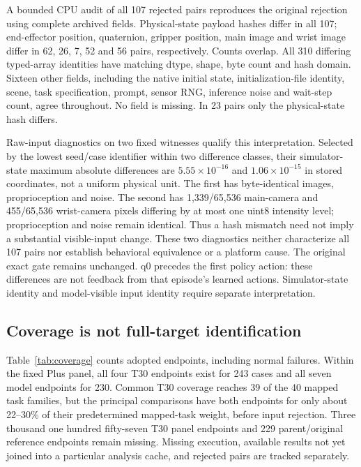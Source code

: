 \documentclass[conference]{IEEEtran}
\begin{document}
A bounded CPU audit of all 107 rejected pairs reproduces the original rejection using complete archived fields. Physical-state payload hashes differ in all 107; end-effector position, quaternion, gripper position, main image and wrist image differ in 62, 26, 7, 52 and 56 pairs, respectively. Counts overlap. All 310 differing typed-array identities have matching dtype, shape, byte count and hash domain. Sixteen other fields, including the native initial state, initialization-file identity, scene, task specification, prompt, sensor RNG, inference noise and wait-step count, agree throughout. No field is missing. In 23 pairs only the physical-state hash differs.

Raw-input diagnostics on two fixed witnesses qualify this interpretation. Selected by the lowest seed/case identifier within two difference classes, their simulator-state maximum absolute differences are $5.55\!\times\!10^{-16}$ and $1.06\!\times\!10^{-15}$ in stored coordinates, not a uniform physical unit. The first has byte-identical images, proprioception and noise. The second has 1,339/65,536 main-camera and 455/65,536 wrist-camera pixels differing by at most one uint8 intensity level; proprioception and noise remain identical. Thus a hash mismatch need not imply a substantial visible-input change. These two diagnostics neither characterize all 107 pairs nor establish behavioral equivalence or a platform cause. The original exact gate remains unchanged. q0 precedes the first policy action: these differences are not feedback from that episode's learned actions. Simulator-state identity and model-visible input identity require separate interpretation.

\subsection{Coverage is not full-target identification}
Table~\ref{tab:coverage} counts adopted endpoints, including normal failures. Within the fixed Plus panel, all four T30 endpoints exist for 243 cases and all seven model endpoints for 230. Common T30 coverage reaches 39 of the 40 mapped task families, but the principal comparisons have both endpoints for only about 22--30\% of their predetermined mapped-task weight, before input rejection. Three thousand one hundred fifty-seven T30 panel endpoints and 229 parent/original reference endpoints remain missing. Missing execution, available results not yet joined into a particular analysis cache, and rejected pairs are tracked separately.
\end{document}

